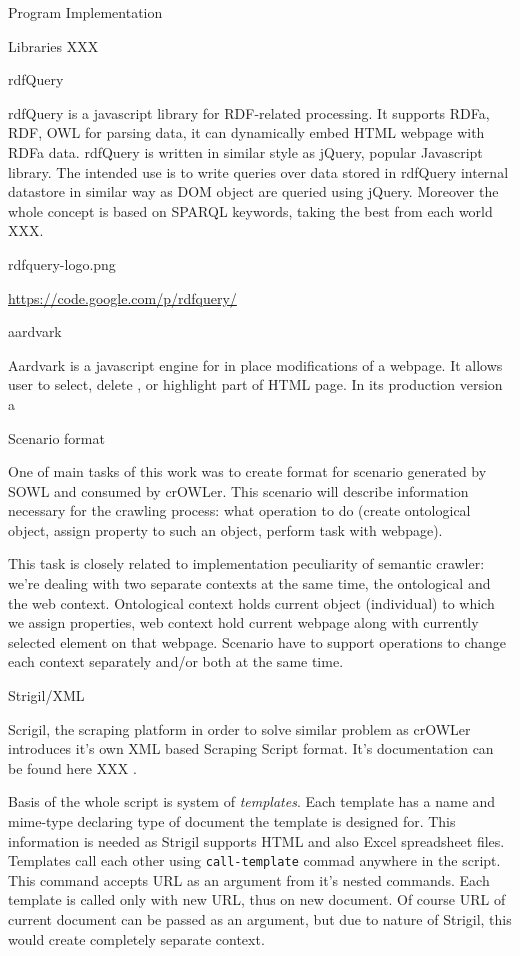  
\chap Program Implementation

\sec Libraries XXX

\secc rdfQuery

rdfQuery is a javascript library for RDF-related processing. It supports RDFa,
RDF, OWL for parsing data, it can dynamically embed HTML webpage with RDFa
data. rdfQuery is written in similar style as jQuery, popular Javascript
library. The intended use is to write queries over data stored in rdfQuery
internal datastore in similar way as DOM object are queried using jQuery.
Moreover the whole concept is based on SPARQL keywords, taking the best from
each world XXX. 

\picw=1cm \cinspic rdfquery-logo.png

\url{https://code.google.com/p/rdfquery/}


\secc aardvark

Aardvark is a javascript engine for in place modifications of a webpage. It
allows user to select, delete , or highlight part of HTML page. In its production version a


\sec Scenario format

One of main tasks of this work was to create format for scenario generated by
SOWL and consumed by crOWLer. This scenario will describe information necessary
for the crawling process: what operation to do (create ontological object,
assign property to such an object, perform task with webpage). 

This task is closely related to implementation peculiarity of semantic crawler:
we're dealing with two separate contexts at the same time, the ontological and
the web context. Ontological context holds current object (individual) to which
we assign properties, web context hold current webpage along with currently
selected element on that webpage. Scenario have to support operations to change
each context separately and/or both at the same time. 



\secc Strigil/XML

Scrigil, the scraping platform in order to solve similar problem as crOWLer
introduces it's own XML based Scraping Script format. It's documentation can be
found here XXX
. 

Basis of the whole script is system of {\em templates}. Each template has a name
and mime-type declaring type of document the template is designed for. This
information is needed as Strigil supports HTML and also Excel spreadsheet
files. Templates call each other using {\tt call-template} commad anywhere in
the script. This command accepts URL as an argument from it's nested commands.
Each template is called only with new URL, thus on new document. Of course URL
of current document can be passed as an argument, but due to nature of Strigil,
this would create completely separate context. 

